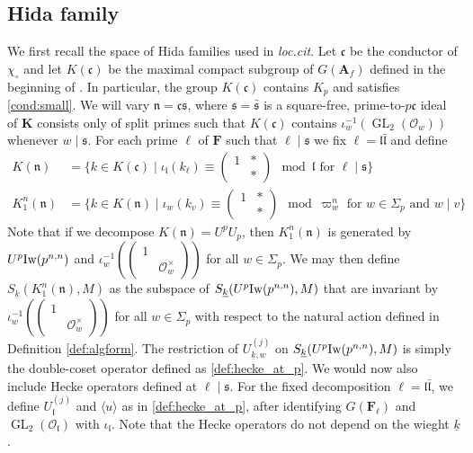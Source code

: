 \documentclass[leqno]{amsart}
\newcommand{\smat}[1]{\left( \begin{smallmatrix} #1 \end{smallmatrix} \right)}
\newcommand{\wt}[1]{\underline{ #1 }}
\newcommand{\Iw}{\textnormal{Iw}}
\DeclareMathOperator{\GL}{GL}
\newcommand{\A}{\mathbf A}
\newcommand{\F}{{\mathbf{F}}} %
\newcommand{\K}{{\mathbf{K}}} %
\newcommand{\oo}{\mathcal{O}} %
\newcommand{\fc}{\mathfrak{c}}
\newcommand{\fs}{\mathfrak{s}}
\newcommand{\fn}{\mathfrak{n}}
\newcommand{\fl}{\mathfrak{l}}
\theoremstyle{definition}
\theoremstyle{remark}
\begin{document}
\subsection{Hida family}

We first recall the space of Hida families
used in \textit{loc.cit}.
Let $\fc$ be the conductor of  $\chi_\circ$
and let $K(\fc)$ be the maximal compact subgroup
of $G(\A_f)$ defined in the beginning of \cite[\S 6]{lee}.
In particular, the group $K(\fc)$ contains $K_p$
and satisfies \eqref{cond:small}.
We will vary $\fn=\fc\fs$,
where $\fs=\bar{\fs}$ is a
square-free, prime-to-$p\fc$
ideal of  $\K$ consists only of split primes
such that  $K(\fc)$
contains  $\iota_w^{-1}(\GL_2(\oo_w))$
whenever $w\mid \fs$.
For each prime $\ell$ of $\F$
such that  $\ell\mid \fs$ we 
fix  $\ell=\fl\bar{\fl}$ and define
\begin{align*}
	K(\fn)&=
	\{
	k\in K(\fc)\mid
	\iota_{\fl}(k_\ell)\equiv
	(\begin{smallmatrix}
		1&*\\&*
	\end{smallmatrix})\mod \fl
	\text{ for } \ell\mid \fs
	\}\\
	K_1^n(\fn)&=
	\{
	k\in K(\fn)\mid
	\iota_{w}(k_v)\equiv
	(\begin{smallmatrix}
		1&*\\&*
	\end{smallmatrix})\mod \varpi_w^n
	\text{ for } w\in \Sigma_p
	\text{ and }w\mid v
	\}
\end{align*}
Note that if we decompose $K(\fn)=U^pU_p$,
then $K^n_1(\fn)$ is generated by $U^p\Iw(p^{n,n})$ 
and $\iota_{w}^{-1}(\smat{1&\\&\oo_w^\times})$
for all $w\in \Sigma_p$.
We may then define 
$S_{\wt{k}}(K^n_1(\fn),M)$
as the subspace of 
$S_{\wt{k}}(U^p\Iw(p^{n,n}),M)$
that are invariant by 
$\iota_{w}^{-1}(\smat{1&\\&\oo_w^\times})$
for all $w\in \Sigma_p$
with respect to the natural action
defined in Definition \ref{def:algform}.
The restriction of $U_{\wt{k},w}^{(j)}$
on $S_{\wt{k}}(U^p\Iw(p^{n,n}),M)$
is simply the double-coset operator 
defined as \eqref{def:hecke_at_p}.
We would now also include
Hecke operators defined at $\ell\mid \fs$.
For the fixed decomposition $\ell=\fl\bar{\fl}$,
we define $U_{\fl}^{(j)}$ and $\langle u\rangle$
as in \eqref{def:hecke_at_p},
after identifying $G(\F_\ell)$
and  $\GL_2(\oo_\fl)$ with  $\iota_\fl$.
Note that the Hecke operators 
do not depend on the wieght  $\wt{k}$.
\end{document}
